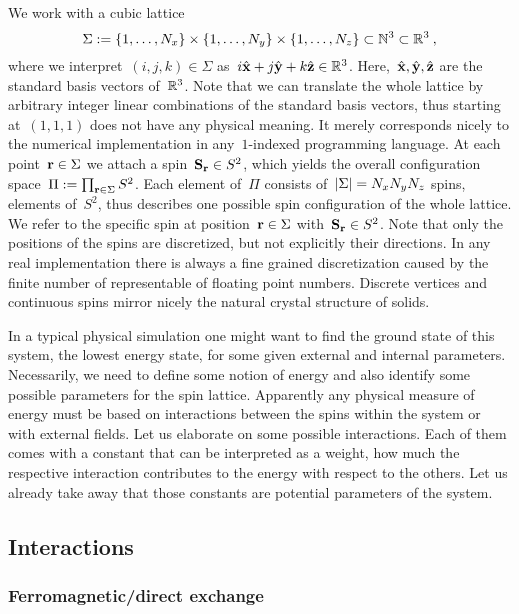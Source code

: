 
We work with a cubic lattice
%
\begin{equation}
  \Sigma := \{1,\dots,N_x\} \times \{1,\dots,N_y\} \times
  \{1,\dots,N_z\} \subset \mathbb{N}^3 \subset \mathbb{R}^3\:,
\end{equation}
%
where we interpret~$(i,j,k) \in \Sigma$ as~$i \hat{\mathbf{x}} + j \hat{\mathbf{y}} + k \hat{\mathbf{z}}
\in \mathbb{R}^3$. Here,~$\hat{\mathbf{x}}, \hat{\mathbf{y}}, \hat{\mathbf{z}}$ are the standard basis vectors of~$\mathbb{R}^3$.
Note that we can translate the whole lattice by arbitrary integer linear
combinations of the standard basis vectors, thus starting at~$(1,1,1)$ does not
have any physical meaning. It merely corresponds nicely to the numerical
implementation in any~$1$-indexed programming language. At each point~$\mathbf{r} \in
\Sigma$ we attach a spin~$\mathbf{S}_{\mathbf{r}} \in S^2$, which yields the overall
configuration space~$\Pi := \prod_{\mathbf{r} \in \Sigma} S^2$.  Each element of~$\Pi$
consists of~$\abs{\Sigma}=N_x N_y N_z$ spins, \ie{} elements of~$S^2$, thus
describes one possible spin configuration of the whole lattice. We refer to the
specific spin at position~$\mathbf{r} \in \Sigma$ with~$\mathbf{S}_{\mathbf{r}} \in S^2$.  Note that
only the positions of the spins are discretized, but not explicitly their
directions. In any real implementation there is always a fine grained
discretization caused by the finite number of representable of floating point
numbers. Discrete vertices and continuous spins mirror nicely the natural
crystal structure of solids.

In a typical physical simulation one might want to find the ground state of this
system, \ie{} the lowest energy state, for some given external and internal
parameters. Necessarily, we need to define some notion of energy and also
identify some possible parameters for the spin lattice. Apparently any physical
measure of energy must be based on interactions between the spins within the
system or with external fields. Let us elaborate on some possible interactions.
Each of them comes with a constant that can be interpreted as a weight, \ie{}
how much the respective interaction contributes to the energy with respect to
the others. Let us already take away that those constants are potential
parameters of the system.

\subsection{Interactions}

\subsubsection{Ferromagnetic/direct exchange}

